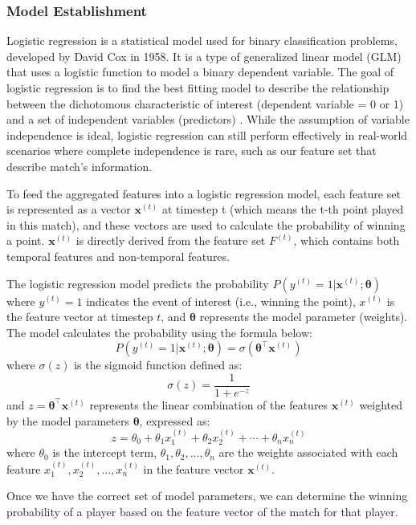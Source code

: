\documentclass[12pt]{article}  %
\begin{document}
\subsubsection{Model Establishment}
Logistic regression is a statistical model used for binary classification problems, developed by David Cox in 1958. It is a type of generalized linear model (GLM) that uses a logistic function to model a binary dependent variable. The goal of logistic regression is to find the best fitting model to describe the relationship between the dichotomous characteristic of interest (dependent variable = 0 or 1) and a set of independent variables (predictors) \cite{5}. While the assumption of variable independence is ideal, logistic regression can still perform effectively in real-world scenarios where complete independence is rare, such as our feature set that describe match's information.

To feed the aggregated features into a logistic regression model, each feature set is represented as a vector $\mathbf{x}^{(t)}$ at timestep t (which means the t-th point played in this match), and these vectors are used to calculate the probability of winning a point. $\mathbf{x}^{(t)}$ is directly derived from the feature set \( F^{(t)} \), which contains both temporal features and non-temporal features.

The logistic regression model predicts the probability $ P(y^{(t)}=1|\mathbf{x}^{(t)}; \mathbf{\theta}) $
where $y^{(t)}=1$ indicates the event of interest (i.e., winning the point), $x^{(t)}$ is the feature vector at timestep $t$, and $\mathbf{\theta}$ represents the model parameter (weights). The model calculates the probability using the formula below:
\[
P(y^{(t)}=1|\mathbf{x}^{(t)}; \mathbf{\theta}) = \sigma(\mathbf{\theta}^\top \mathbf{x}^{(t)})
\]
where \( \sigma(z) \) is the sigmoid function defined as:
\[
\sigma(z) = \frac{1}{1 + e^{-z}}
\]
and \( z = \mathbf{\theta}^\top \mathbf{x}^{(t)} \) represents the linear combination of the features \( \mathbf{x}^{(t)} \) weighted by the model parameters \( \mathbf{\theta} \), expressed as:
\[
z = \theta_0 + \theta_1 x_1^{(t)} + \theta_2 x_2^{(t)} + \cdots + \theta_n x_n^{(t)}
\]
where \( \theta_0 \) is the intercept term, \( \theta_1, \theta_2, \ldots, \theta_n \) are the weights associated with each feature \( x_1^{(t)}, x_2^{(t)}, \ldots, x_n^{(t)} \) in the feature vector \( \mathbf{x}^{(t)} \).

Once we have the correct set of model parameters, we can determine the winning probability of a player based on the feature vector of the match for that player.
\end{document}
